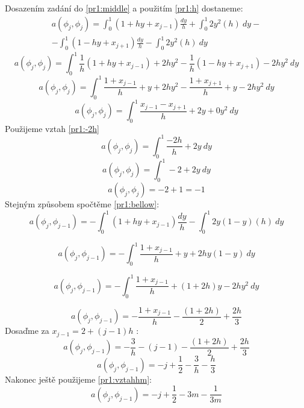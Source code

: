 \documentclass[../main.tex]{subfiles}
\begin{document}
Dosazením zadání do \eqref{pr1:middle} a použitím \eqref{pr1:h} dostaneme:
\begin{multline}
    a(\phi_j, \phi_j) = \int_0^1 \left( 1 + hy + x_{j-1}\right) \frac{dy}{h} + \int_0^1 2 y^2 (h) \ dy -\\- \int_0^1 (1 -hy + x_{j+1}) \frac{dy}{ h} - \int_0^1 2 y^2 (h) \ dy
\end{multline}
\begin{equation}
    a(\phi_j, \phi_j) = \int_0^1 \frac{1}{h}\left( 1 + hy + x_{j-1}\right)  +  2h y^2   -  \frac{1}{ h}(1 -hy + x_{j+1})  - 2h y^2 \ dy
\end{equation}
\begin{equation}
    a(\phi_j, \phi_j) = \int_0^1 \frac{1 + x_{j-1}}{h}  + y +  2h y^2   -  \frac{1+ x_{j+1}}{ h} + y   - 2h y^2 \ dy
\end{equation}
\begin{equation}
    a(\phi_j, \phi_j) = \int_0^1 \frac{x_{j-1}- x_{j+1}}{h}  + 2y +  0 y^2 \ dy
\end{equation}
Použijeme vztah \eqref{pr1:-2h}
\begin{equation}
    a(\phi_j, \phi_j) = \int_0^1 \frac{-2h}{h}  + 2y \ dy
\end{equation}
\begin{equation}
    a(\phi_j, \phi_j) = \int_0^1 -2  + 2y \ dy
\end{equation}
\begin{equation}
    a(\phi_j, \phi_j) = -2  + 1 = -1
\end{equation}
Stejným způsobem spočtěme \eqref{pr1:bellow}:
\begin{equation}
    a(\phi_j, \phi_{j-1}) = - \int_0^1 (1+hy + x_{j-1}) \frac{dy}{h} - \int_0^1 2 y(1-y) (h) \ dy
\end{equation}

\begin{equation}
    a(\phi_j, \phi_{j-1}) = - \int_0^1 \frac{1+ x_{j-1}}{h} + y  + 2h y(1-y) \ dy
\end{equation}

\begin{equation}
    a(\phi_j, \phi_{j-1}) = - \int_0^1 \frac{1+ x_{j-1}}{h} + (1+2h)y - 2h y^2 \ dy
\end{equation}

\begin{equation}
    a(\phi_j, \phi_{j-1}) = -  \frac{1+ x_{j-1}}{h} - \frac{(1+2h)}{2} + \frac{2h}{3}
\end{equation}
Dosaďme za $x_{j-1} = 2 + (j-1)h$ : 
\begin{equation}
    a(\phi_j, \phi_{j-1}) = -  \frac{3}{h} - (j-1) - \frac{(1+2h)}{2} + \frac{2h}{3}
\end{equation}
\begin{equation}
    a(\phi_j, \phi_{j-1}) = -j + \frac{1}{2} -\frac{3}{h} -\frac{h}{3}
\end{equation}
Nakonec ještě použijeme \eqref{pr1:vztahhm}:
\begin{equation}
    a(\phi_j, \phi_{j-1}) = -j + \frac{1}{2} -3m -\frac{1}{3m}
\end{equation}
\end{document}
